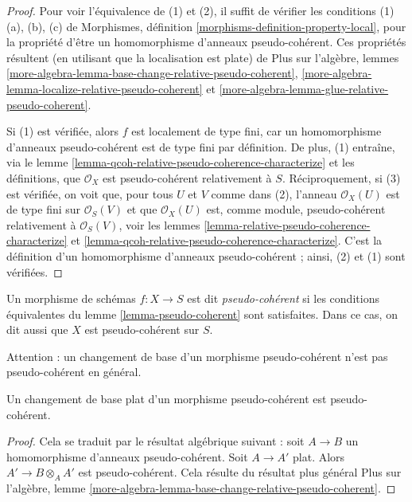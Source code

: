 \begin{proof}
Pour voir l'équivalence de (1) et (2), il suffit de vérifier les conditions
(1)(a), (b), (c) de
Morphismes, définition \ref{morphisms-definition-property-local},
pour la propriété d'être un homomorphisme d'anneaux pseudo-cohérent.
Ces propriétés résultent (en utilisant que la localisation est plate) de
Plus sur l'algèbre, lemmes
\ref{more-algebra-lemma-base-change-relative-pseudo-coherent},
\ref{more-algebra-lemma-localize-relative-pseudo-coherent} et
\ref{more-algebra-lemma-glue-relative-pseudo-coherent}.

\medskip\noindent
Si (1) est vérifiée, alors $f$ est localement de type fini, car un homomorphisme
d'anneaux pseudo-cohérent est de type fini par définition. De plus, (1) entraîne,
via le lemme \ref{lemma-qcoh-relative-pseudo-coherence-characterize}
et les définitions, que $\mathcal{O}_X$ est pseudo-cohérent
relativement à $S$. Réciproquement, si (3) est vérifiée, on voit
que, pour tous $U$ et $V$ comme dans (2), l'anneau
$\mathcal{O}_X(U)$ est de type fini sur $\mathcal{O}_S(V)$
et que $\mathcal{O}_X(U)$ est, comme module,
pseudo-cohérent relativement à $\mathcal{O}_S(V)$, voir les
lemmes \ref{lemma-relative-pseudo-coherence-characterize} et
\ref{lemma-qcoh-relative-pseudo-coherence-characterize}.
C'est la définition d'un homomorphisme d'anneaux pseudo-cohérent ; ainsi,
(2) et (1) sont vérifiées.
\end{proof}

\begin{definition}
\label{definition-pseudo-coherent}
Un morphisme de schémas $f : X \to S$ est dit {\it pseudo-cohérent}
si les conditions équivalentes du
lemme \ref{lemma-pseudo-coherent}
sont satisfaites. Dans ce cas, on dit aussi que $X$ est pseudo-cohérent
sur $S$.
\end{definition}

\noindent
Attention : un changement de base d'un morphisme pseudo-cohérent n'est pas
pseudo-cohérent en général.

\begin{lemma}
\label{lemma-flat-base-change-pseudo-coherent}
Un changement de base plat d'un morphisme pseudo-cohérent est pseudo-cohérent.
\end{lemma}

\begin{proof}
Cela se traduit par le résultat algébrique suivant :
soit $A \to B$ un homomorphisme d'anneaux pseudo-cohérent.
Soit $A \to A'$ plat. Alors $A' \to B \otimes_A A'$ est
pseudo-cohérent. Cela résulte du résultat plus général
Plus sur l'algèbre,
lemme \ref{more-algebra-lemma-base-change-relative-pseudo-coherent}.
\end{proof}

